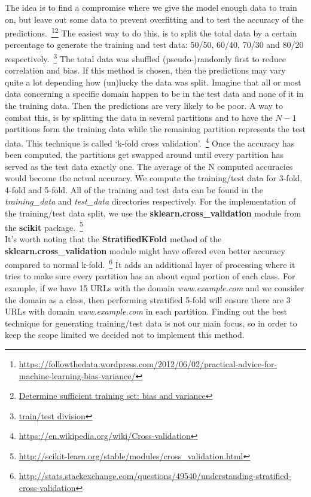 The idea is to find a compromise where we give the model enough data to train on, but leave out some data to prevent overfitting and to test the accuracy of the predictions.~\footnote{\url{https://followthedata.wordpress.com/2012/06/02/practical-advice-for-machine-learning-bias-variance/}}\footnote{\href{https://www.quora.com/When-establishing-a-ground-truth-for-machine-learning-how-does-one-determine-if-it-is-a-sufficient-training-set}{Determine sufficient training set: bias and variance}} The easiest way to do this, is to split the total data by a certain percentage to generate the training and test data: 50/50, 60/40, 70/30 and 80/20 respectively.~\footnote{\href{https://www.researchgate.net/post/What_is_the_best_way_to_divide_our_dataset_into_training_and_test_sets}{train/test division}} The total data was shuffled (pseudo-)randomly first to reduce correlation and bias. If this method is chosen, then the predictions may vary quite a lot depending how (un)lucky the data was split. Imagine that all or most data concerning a specific domain happen to be in the test data and none of it in the training data. Then the predictions are very likely to be poor. A way to combat this, is by splitting the data in several partitions and to have the $N-1$ partitions form the training data while the remaining partition represents the test data. This technique is called `k-fold cross validation'.~\footnote{\url{https://en.wikipedia.org/wiki/Cross-validation}} Once the accuracy has been computed, the partitions get swapped around until every partition has served as the test data exactly one. The average of the N computed accuracies would become the actual accuracy. We compute the training/test data for 3-fold, 4-fold and 5-fold. All of the training and test data can be found in the \textit{training\_data} and \textit{test\_data} directories respectively. For the implementation of the training/test data split, we use the \textbf{sklearn.cross\_validation} module from the \textbf{scikit} package.~\footnote{\url{http://scikit-learn.org/stable/modules/cross_validation.html}}
\\[2ex]
It's worth noting that the \textbf{StratifiedKFold} method of the \textbf{sklearn.cross\_validation} module might have offered even better accuracy compared to normal k-fold.~\footnote{\url{http://stats.stackexchange.com/questions/49540/understanding-stratified-cross-validation}} It adds an additional layer of processing where it tries to make sure every partition has an about equal portion of each class. For example, if we have 15 URLs with the domain \textit{www.example.com} and we consider the domain as a class, then performing stratified 5-fold will ensure there are 3 URLs with domain \textit{www.example.com} in each partition. Finding out the best technique for generating training/test data is not our main focus, so in order to keep the scope limited we decided not to implement this method.
